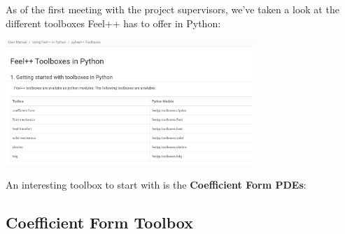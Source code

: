 \documentclass[12pt]{article}
\begin{document}
As of the first meeting with the project supervisors, we've taken a look at the different toolboxes Feel++ has to offer in Python:
\begin{frame}{}
    \begin{center}
        \includegraphics[width=0.7\textwidth]{images/pyfeelpptoolboxes.png}
    \end{center}
\end{frame}

An interesting toolbox to start with is the \textbf{Coefficient Form PDEs}:

\subsection{Coefficient Form Toolbox}
\end{document}
